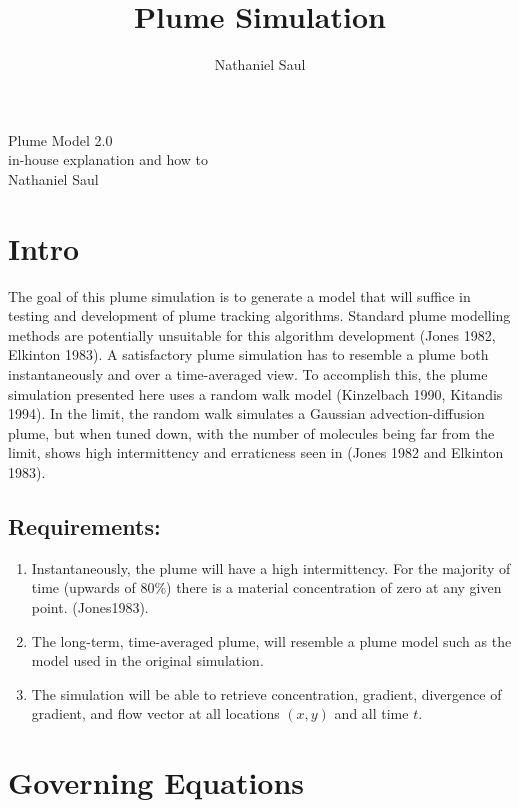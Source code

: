 \documentclass[11pt]{article} %
\title{Plume Simulation}
\author{Nathaniel Saul}
\begin{document}
\lstset{language=bash}
\begin{center}
	{\LARGE Plume Model 2.0 }\\
	{in-house explanation and how to}\\
	{Nathaniel Saul}\\
\end{center}


\section{Intro}

The goal of this plume simulation is to generate a model that will suffice in testing and development of plume tracking algorithms.  Standard plume modelling methods are potentially unsuitable for this algorithm development (Jones 1982, Elkinton 1983).  A satisfactory plume simulation has to resemble a plume both instantaneously and over a time-averaged view.  To accomplish this, the plume simulation presented here uses a random walk model (Kinzelbach 1990, Kitandis 1994).  In the limit, the random walk simulates a Gaussian advection-diffusion plume, but when tuned down, with the number of molecules being far from the limit, shows high intermittency and erraticness seen in (Jones 1982 and Elkinton 1983).


\subsection{Requirements:}
\begin{enumerate}
\item Instantaneously, the plume will have a high intermittency.   For the majority of time (upwards of 80\%) there is a material concentration of zero at any given point. (Jones1983).   

\item The long-term, time-averaged plume, will resemble a plume model such as the model used in the original simulation.

\item The simulation will be able to retrieve concentration, gradient, divergence of gradient, and flow vector at all locations $(x,y)$ and all time $t$.


\end{enumerate}

\section{Governing Equations} 
\end{document}
